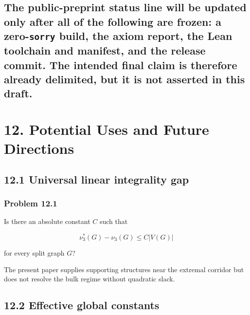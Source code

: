 \documentclass[
  11pt,
]{article}
\begin{document}
\subsection{\texorpdfstring{The public-preprint status line will be
updated only after all of the following are frozen: a
zero-\texttt{sorry} build, the axiom report, the Lean toolchain and
manifest, and the release commit. The intended final claim is therefore
already delimited, but it is not asserted in this
draft.}{The public-preprint status line will be updated only after all of the following are frozen: a zero-sorry build, the axiom report, the Lean toolchain and manifest, and the release commit. The intended final claim is therefore already delimited, but it is not asserted in this draft.}}\label{the-public-preprint-status-line-will-be-updated-only-after-all-of-the-following-are-frozen-a-zero-sorry-build-the-axiom-report-the-lean-toolchain-and-manifest-and-the-release-commit.-the-intended-final-claim-is-therefore-already-delimited-but-it-is-not-asserted-in-this-draft.}

\section{12. Potential Uses and Future
Directions}\label{potential-uses-and-future-directions}

\subsection{12.1 Universal linear integrality
gap}\label{universal-linear-integrality-gap}

\subsubsection{Problem 12.1}\label{problem-12.1}

Is there an absolute constant \(C\) such that

\[
\nu_3^*(G)-\nu_3(G)
\le C|V(G)|
\]

for every split graph \(G\)?

The present paper supplies supporting structures near the extremal
corridor but does not resolve the bulk regime without quadratic slack.

\subsection{12.2 Effective global
constants}\label{effective-global-constants}
\end{document}
